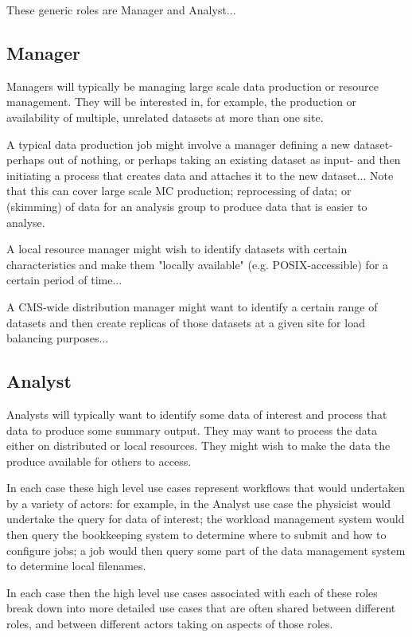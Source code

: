 \documentclass{article}
\begin{document}
These generic roles are Manager and Analyst...

\subsection{Manager}
Managers will typically be managing large scale data production or resource management. They will be interested in, for example, the production or availability of multiple, unrelated datasets at more than one site.

A typical data production job might involve a manager defining a new dataset- perhaps out of nothing, or perhaps taking an existing dataset as input- and then initiating a process that creates data and attaches it to the new dataset... Note that this can cover large scale MC production; reprocessing of data; or (skimming) of data for an analysis group to produce data that is easier to analyse. 

A local resource manager might wish to identify datasets with certain characteristics and make them "locally available" (e.g. POSIX-accessible) for a certain period of time...

A CMS-wide distribution manager might want to identify a certain range of datasets and then create replicas of those datasets at a given site for load balancing purposes...

\subsection{Analyst}
Analysts will typically want to identify some data of interest and process that data to produce some summary output. They may want to process the data either on  distributed or local resources. They might wish to make the data the produce available for others to access.

In each case these high level use cases represent workflows that would undertaken by a variety of actors: for example, in the Analyst use case the physicist would undertake the query for data of interest; the workload management system would then query the bookkeeping system to determine where to submit and how to configure jobs; a job would then query some part of the data management system to determine local filenames.

In each case then the high level use cases associated with each of these roles break down into more detailed use cases that are often shared between different roles, and between different actors taking on aspects of those roles.
\end{document}
